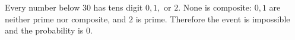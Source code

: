 Every number below $30$ has tens digit $0,1,$ or $2$. None is composite: $0,1$ are neither prime nor composite, and $2$ is prime. Therefore the event is impossible and the probability is $\boxed0$.
